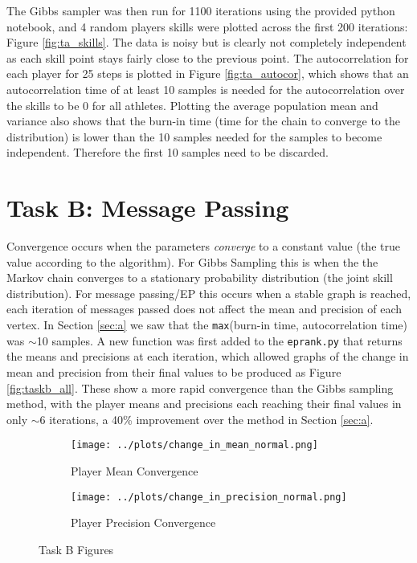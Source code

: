 \documentclass[11pt]{amsart}
\begin{document}
The Gibbs sampler was then run for 1100 iterations using the provided python notebook, and 4 random players skills were plotted across the first 200 iterations: Figure \ref{fig:ta_skills}. The data is noisy but is clearly not completely independent as each skill point stays fairly close to the previous point. The autocorrelation for each player for 25 steps is plotted in Figure \ref{fig:ta_autocor}, which shows that an autocorrelation time of at least 10 samples is needed for the autocorrelation over the skills to be 0 for all athletes. Plotting the average population mean and variance also shows that the burn-in time (time for the chain to converge to the distribution) is lower than the 10 samples needed for the samples to become independent. Therefore the first 10 samples need to be discarded.



\section{Task B: Message Passing} \label{sec:b}
Convergence occurs when the parameters \emph{converge} to a constant value (the true value according to the algorithm). For Gibbs Sampling this is when the the Markov chain converges to a stationary probability distribution (the joint skill distribution). For message passing/EP this occurs when a stable graph is reached, each iteration of messages passed does not affect the mean and precision of each vertex. In Section \ref{sec:a} we saw that the \verb|max|(burn-in time, autocorrelation time) was $\sim$10 samples. A new function was first added to the \verb|eprank.py| that returns the means and precisions at each iteration, which allowed graphs of the change in mean and precision from their final values to be produced as Figure \ref{fig:taskb_all}. These show a more rapid convergence than the Gibbs sampling method, with the player means and precisions each reaching their final values in only $\sim$6 iterations, a 40\% improvement over the method in Section \ref{sec:a}.
\begin{figure}[h]
    \centering
    \begin{subfigure}[b]{0.495\textwidth}
        \centering
        \texttt{[image: ../plots/change\_in\_mean\_normal.png]}
        \caption{Player Mean Convergence}
        \label{fig:tb_means}
    \end{subfigure}
    \hfill
    \begin{subfigure}[b]{0.495\textwidth}
        \centering
        \texttt{[image: ../plots/change\_in\_precision\_normal.png]}
        \caption{Player Precision Convergence}
        \label{fig:tb_precs}
    \end{subfigure}
    \caption{Task B Figures}
\end{figure} \label{fig:taskb_all}
\end{document}
